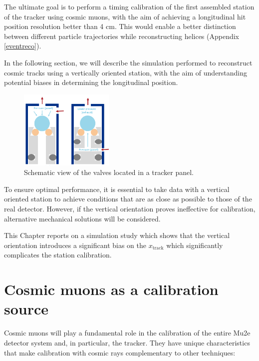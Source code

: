 The ultimate goal is to perform a timing calibration of 
the first assembled station of the tracker using 
cosmic muons, with the aim of achieving a longitudinal hit 
position resolution better than 4 cm. This would enable a better distinction 
between different particle trajectories while reconstructing helices (Appendix \ref{eventreco}).

In the following section, we will describe the simulation performed to 
reconstruct cosmic tracks using a vertically oriented station, 
with the aim of understanding 
potential biases in determining the longitudinal position.

\begin{figure}[!h]
    \centering
    \includegraphics[width =0.4\textwidth]{figures/png/gassystem.png}
    \caption[Schematic view of the valves located in a tracker panel.]{Schematic view of the valves located in a tracker panel.}
    \label{fig:gassystem}
\end{figure}
To ensure optimal performance, it is essential to take data with a vertical oriented station 
to achieve conditions that are as close as possible to those of the real detector. 
However, if the vertical orientation proves ineffective for calibration, 
alternative mechanical solutions will be considered.

This Chapter reports on a simulation study 
which shows that the vertical orientation introduces a significant bias on 
the $x_{\text{track}}$ which significantly complicates 
the station calibration. 



\section{Cosmic muons as a calibration source}
Cosmic muons will play a fundamental role in the 
calibration of the entire Mu2e detector system and, 
in particular, the tracker. They have unique 
characteristics that make calibration with cosmic rays 
complementary to other techniques:

 

